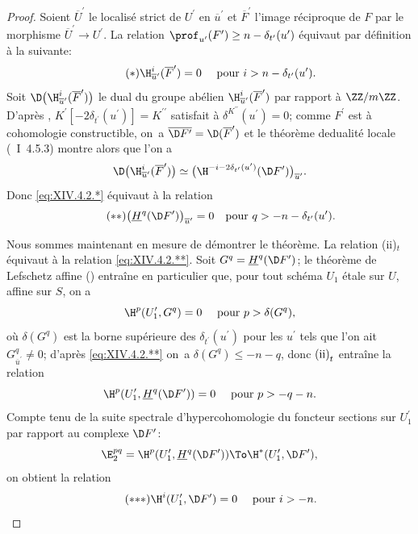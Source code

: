 \begin{proof}
Soient $\overline{U}^{\prime}$ le localis\'e strict de $U^{\prime}$ en $\overline{u}^{\prime}$ et $\overline{F}^{\prime}$ l'image r\'eciproque de $F$ par le morphisme $\overline{U}^{\prime}\to U^{\prime}$. La relation $\prof_{u^{\prime}}(F^{\prime})\geq n-\delta_{t^{\prime}}(u^{\prime})$ \'equivaut par d\'efinition \`a la suivante:
\begin{equation*} \label{eq:XIV.4.2.*} \tag{$*$} {\H_{\overline{u}^{\prime}}^{i}(\overline{F}^{\prime})=0\quad\textrm{ pour }i>n-\delta_{t^{\prime}}(u^{\prime}).}
\end{equation*}
Soit $\D\big(\H_{\overline{u}^{\prime}}^{i}(\overline{F}^{\prime})\big)$ le dual du groupe ab\'elien $\H_{\overline{u}^{\prime}}^{i}(\overline{F}^{\prime})$ par rapport \`a $\ZZ/m\ZZ$. D'apr\`es , $K^{\prime}[-2\delta_{t^{\prime}}(u^{\prime})]=K^{\prime\prime}$ satisfait \`a $\delta^{K^{\prime\prime}}(u^{\prime})=0$; comme $F^{\prime}$ est \`a cohomologie constructible, on~a $\overline{\D F^{\prime}}=\D(\overline{F}^{\prime})$ et le th\'eor\`eme de\pageoriginale dualit\'e locale (~I~4.5.3) montre alors que l'on a
$$
\D\big(\H_{\overline{u}^{\prime}}^{i}(\overline{F}^{\prime})\big) \simeq\big(\H^{-i-2\delta_{t^{\prime}}(u^{\prime})}(\D F^{\prime})\big)_{\overline{u}^{\prime}}.
$$
Donc \eqref{eq:XIV.4.2.*} \'equivaut \`a la relation
\begin{equation*} \label{eq:XIV.4.2.**} \tag{$**$}
\big(\underline{H}^{q}(\D F^{\prime})\big)_{\overline{u}^{\prime}}=0\quad\text{pour }q>-n-\delta_{t^{\prime}}(u^{\prime}).
\end{equation*}

Nous sommes maintenant en mesure de d\'emontrer le th\'eor\`eme. La relation \textup{(ii)}$_{t}$ \'equivaut \`a la relation \eqref{eq:XIV.4.2.**}. Soit $G^{q}=\underline{H}^{q}(\D F^{\prime})$; le th\'eor\`eme de Lefschetz affine () entra\^ine en particulier que, pour tout sch\'ema $U_{1}$ \'etale sur $U$, affine sur $S$, on a
$$
\H^{p}(U_{1}^{\prime}, G^{q})=0\quad\textrm{ pour }p>\delta(G^{q}),
$$
o\`u $\delta(G^{q})$ est la borne sup\'erieure des $\delta_{t^{\prime}}(u^{\prime})$ pour les $u^{\prime}$ tels que l'on ait $G_{\overline{u}^{\prime}}^{q}\neq 0$; d'apr\`es \eqref{eq:XIV.4.2.**} on~a $\delta(G^{q})\leq -n-q$, donc $\textup{(ii)}_{t}$ entra\^ine la relation
$$
\H^{p}(U_{1}^{\prime}, \underline{H}^{q}(\D F^{\prime}))=0\quad\textrm{ pour }p>-q-n.
$$
Compte tenu de la suite spectrale d'hypercohomologie du foncteur \og sections sur $U_{1}^{\prime}$\fg par rapport au complexe $\D F^{\prime}$:
$$
\E_{2}^{pq}=\H^{p}(U_{1}^{\prime}, \underline{H}^{q}(\D F^{\prime}))\To\H^{\ast}(U_{1}^{\prime}, \D F^{\prime}),
$$
on obtient la relation
\begin{equation*} \label{eq:XIV.4.2.***} \tag{${*}{*}{*}$}
\H^{i}(U_{1}^{\prime}, \D F^{\prime})=0\quad\textrm{ pour }i>-n.
\end{equation*}


\end{proof}
